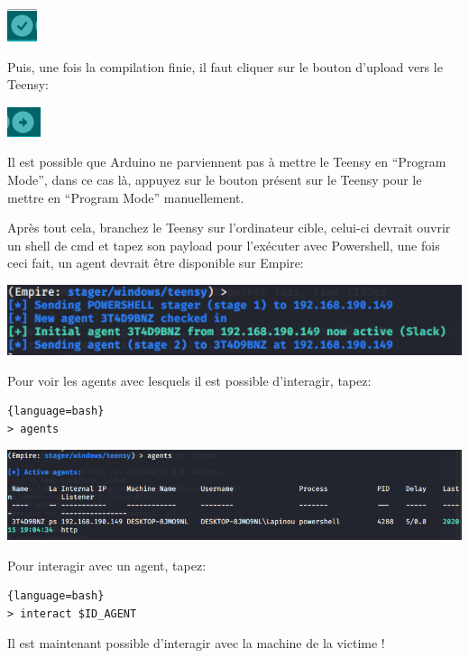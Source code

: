 \includegraphics[scale=0.8]{images/SEN_Projet_Image010.jpeg}

Puis, une fois la compilation finie, il faut cliquer sur le bouton d’upload vers le Teensy:

\includegraphics[scale=0.8]{images/SEN_Projet_Image011.jpeg}

Il est possible que Arduino ne parviennent pas à mettre le Teensy en “Program Mode”, dans ce cas là, appuyez sur 
le bouton présent sur le Teensy pour le mettre en “Program Mode” manuellement.

Après tout cela, branchez le Teensy sur l’ordinateur cible, celui-ci devrait ouvrir un shell de cmd et tapez 
son payload pour l'exécuter avec Powershell, une fois ceci fait, un agent devrait être disponible sur Empire:

\includegraphics[scale=0.8]{images/SEN_Projet_Image07.png}

Pour voir les agents avec lesquels il est possible d'interagir, tapez:

\begin{lstlisting}{language=bash}
> agents
\end{lstlisting}

\includegraphics[scale=0.5]{images/SEN_Projet_Image08.png}

Pour interagir avec un agent, tapez:

\begin{lstlisting}{language=bash}
> interact $ID_AGENT
\end{lstlisting}

Il est maintenant possible d'interagir avec la machine de la victime !

